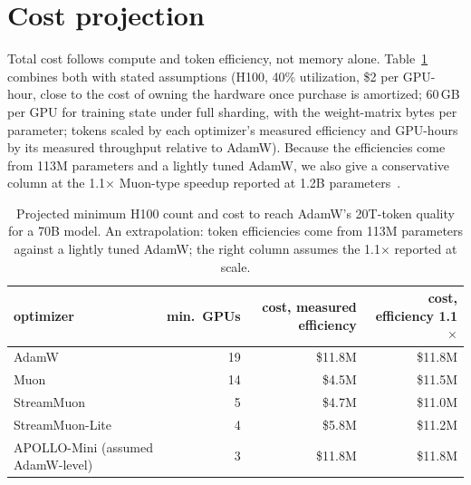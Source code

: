 \documentclass[10pt]{article}
\newcommand{\method}{StreamMuon}\newcommand{\lite}{StreamMuon-Lite}
\begin{document}
\FloatBarrier
\section{Cost projection}
\label{app:cost}
Total cost follows compute and token efficiency, not memory alone. Table~\ref{tab:proj} combines both with
stated assumptions (H100, 40\% utilization, \$2 per GPU-hour, close to the cost of owning the hardware once purchase is
amortized; 60\,GB per GPU for training state under full sharding, with the weight-matrix bytes per parameter; tokens scaled by each optimizer's measured efficiency
and GPU-hours by its measured throughput relative to AdamW). Because the efficiencies come from 113M parameters and a
lightly tuned AdamW, we also give a conservative column at the 1.1$\times$ Muon-type speedup reported at 1.2B
parameters~\citep{wen2026fantastic}.

\begin{table}[!htb]
\centering\small
\caption{Projected minimum H100 count and cost to reach AdamW's 20T-token quality for a 70B model. An extrapolation:
token efficiencies come from 113M parameters against a lightly tuned AdamW; the right column assumes the 1.1$\times$
reported at scale.}
\label{tab:proj}
\begin{tabular}{lrrr}
\toprule
optimizer & min.\ GPUs & cost, measured efficiency & cost, efficiency 1.1$\times$ \\
\midrule
AdamW & 19 & \$11.8M & \$11.8M \\
Muon & 14 & \$4.5M & \$11.5M \\
\method{} & 5 & \$4.7M & \$11.0M \\
\lite{} & 4 & \$5.8M & \$11.2M \\
APOLLO-Mini (assumed AdamW-level) & 3 & \$11.8M & \$11.8M \\
\bottomrule
\end{tabular}
\end{table}
\end{document}

